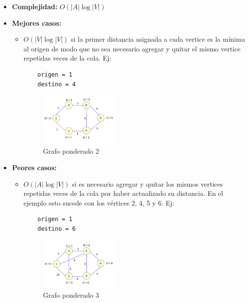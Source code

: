 \documentclass[a4paper,10pt]{article}
\begin{document}
\begin{itemize}
\item \textbf{Complejidad:} $O(|A| \log{|V|})$
\item \textbf{Mejores casos:}
	\begin{itemize}
	\item $O(|V| \log{|V|})$ si la primer distancia asignada a cada vertice es la mínima al origen de modo que no sea necesario agregar y quitar el mismo vertice repetidas veces de la cola. Ej:
	\begin{verbatim}
	origen = 1
	destino = 4
	\end{verbatim}
	\begin{figure}[H]
	\begin{center}
	\includegraphics[width=0.4\textwidth]{./g5.png}
	\caption{Grafo ponderado 2}
	\label{fig:g5}
	\end{center}
	\end{figure}
	\end{itemize}
\item \textbf{Peores casos:}
	\begin{itemize}
	\item $O(|A| \log{|V|})$ si es necesario agregar y quitar los mismos vertices repetidas veces de la cola por haber actualizado su distancia. En el ejemplo esto sucede con los vértices 2, 4, 5 y 6. Ej:
	\begin{verbatim}
	origen = 1
	destino = 6
	\end{verbatim}
	\begin{figure}[H]
	\begin{center}
	\includegraphics[width=0.4\textwidth]{./g6.png}
	\caption{Grafo ponderado 3}
	\label{fig:g6}
	\end{center}
	\end{figure}
	\end{itemize}
\end{itemize}
\end{document}
